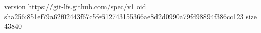 version https://git-lfs.github.com/spec/v1
oid sha256:851ef79a62f02443f67c5fe612743155366ae8d2d0990a79fd98894f386cc123
size 43840
